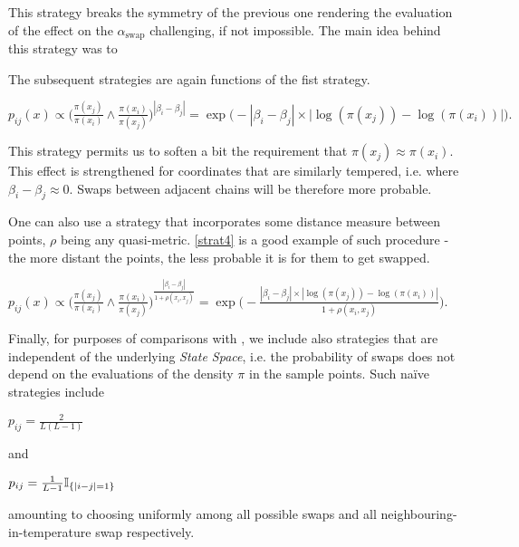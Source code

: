 This strategy breaks the symmetry of the previous one rendering the evaluation of the effect on the $\alpha_\text{swap}$ challenging, if not impossible. The main idea behind this strategy was to  


The subsequent strategies are again functions of the fist strategy.

\begin{strategy}[resume]
	\item 
		$p_{ij}(x) \propto 
			\Big( \frac{\pi (x_j)}{\pi( x_i )} \wedge 
			\frac{\pi (	x_i)}{\pi( x_j )} \Big)^{|\beta_i - \beta_j|} = 
		\exp \Big( - |\beta_i - \beta_j| \times \big| \log ( \pi(x_j) ) - \log ( \pi(x_i) ) \big| \Big).$\label{strat3} 
\end{strategy}

This strategy permits us to soften a bit the requirement that $\pi(x_j) \approx \pi (x_i)$. This effect is strengthened for coordinates that are similarly tempered, i.e. where $\beta_i - \beta_j \approx 0$. Swaps between adjacent chains will be therefore more probable. 

One can also use a strategy that incorporates some distance measure between points, $\rho$ being any quasi-metric. \ref{strat4} is a good example of such procedure - the more distant the points, the less probable it is for them to get swapped.  

\begin{strategy}[resume]
	\item 
		$p_{ij}(x) \propto \Big( \frac{\pi (x_j)}{\pi( x_i )} \wedge \frac{\pi (x_i)}{\pi( x_j )} \Big)^\frac{|\beta_i - \beta_j|}{1 + \rho(x_i, x_j)} = \exp \Big( - \frac{|\beta_i - \beta_j| \times | \log ( \pi(x_j) ) - \log ( \pi(x_i) ) |}{{1 + \rho(x_i, x_j)}} \Big).$\label{strat4}
\end{strategy} 

Finally, for purposes of comparisons with \citet{BaragattiParallelTemperingWithEquiEnergyMoves}, we include also strategies that are independent of the underlying {\it State Space}, i.e. the probability of swaps does not depend on the evaluations of the density $\pi$ in the sample points. Such na\"ive strategies include 

\begin{strategy}[resume]
	\item $p_{ij} = \frac{2}{L (L - 1)}$\label{strat5}
\end{strategy}

and 

\begin{strategy}[resume]
	\item $p_{ij} = \frac{1}{L - 1} \mathbb{I}_{ \{|i-j|=1\} }$\label{strat6}
\end{strategy}

amounting to choosing uniformly among all possible swaps and all neighbouring-in-temperature swap respectively. 